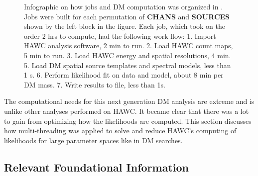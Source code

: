 \begin{figure}[h]
    \caption{Infographic on how jobs and DM computation was organized in . Jobs were built for each permutation of \textbf{CHANS} and \textbf{SOURCES} shown by the left block in the figure. Each job, which took on the order 2 hrs to compute, had the following work flow: 1. Import HAWC analysis software, 2 min to run. 2. Load HAWC count maps, 5 min to run. 3. Load HAWC energy and spatial resolutions, 4 min. 5. Load DM spatial source templates and spectral models, less than 1 s. 6. Perform likelihood fit on data and model, about 8 min per DM mass. 7. Write results to file, less than 1s.}
    \label{fig:mtd_gd_workflow}
\end{figure}

The computational needs for this next generation DM analysis are extreme and is unlike other analyses performed on HAWC.
It became clear that there was a lot to gain from optimizing how the likelihoods are computed.
This section discusses how multi-threading was applied to solve and reduce HAWC's computing of likelihoods for large parameter spaces like in DM searches.

\subsection{Relevant Foundational Information}\label{sec:mtd_foundation}

